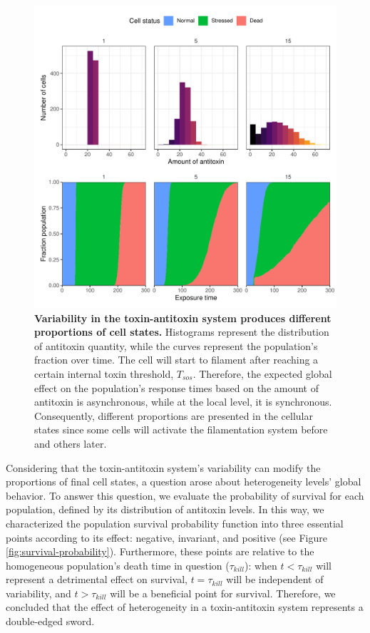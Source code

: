 \documentclass[a4paper, nobind]{templates/ociamthesis}
\begin{document}
\begin{figure}[H]
\includegraphics[width=1\linewidth]{downloadFigs4latex__main/variability-toxin-antitoxin} \caption[Variability in the toxin-antitoxin system produces different proportions of cell states.]{\textbf{Variability in the toxin-antitoxin system produces different proportions of cell states.} Histograms represent the distribution of antitoxin quantity, while the curves represent the population's fraction over time. The cell will start to filament after reaching a certain internal toxin threshold, \(T_{sos}\). Therefore, the expected global effect on the population's response times based on the amount of antitoxin is asynchronous, while at the local level, it is synchronous. Consequently, different proportions are presented in the cellular states since some cells will activate the filamentation system before and others later.}\label{fig:variability-toxin-antitoxin}
\end{figure}

Considering that the toxin-antitoxin system's variability can modify the proportions of final cell states, a question arose about heterogeneity levels' global behavior.
To answer this question, we evaluate the probability of survival for each population, defined by its distribution of antitoxin levels.
In this way, we characterized the population survival probability function into three essential points according to its effect: negative, invariant, and positive (see Figure \ref{fig:survival-probability}).
Furthermore, these points are relative to the homogeneous population's death time in question (\(\tau_{kill}\)): when \(t < \tau_{kill}\) will represent a detrimental effect on survival, \(t = \tau_{kill}\) will be independent of variability, and \(t > \tau_{kill}\) will be a beneficial point for survival.
Therefore, we concluded that the effect of heterogeneity in a toxin-antitoxin system represents a double-edged sword.
\end{document}
